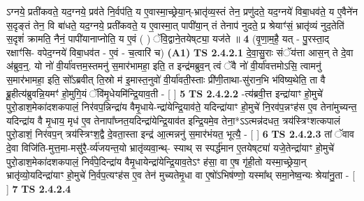 \documentclass[17pt]{extarticle}
\begin{document}
                  ऽग्नये॒ प्रती॑कवते॒ यद॒ग्नये॒ प्रव॑ते नि॒र्वप॑ति॒ य ए॒वास्मा॒च्छ्रेया॒न्-भ्रातृ॑व्य॒स्तं तेन॒ प्रणु॑दते॒ यद॒ग्नये॑ विबा॒धव॑ते॒ य ए॒वैने॑न स॒दृङ्तं तेन॒ वि बा॑धते॒ यद॒ग्नये॒ प्रती॑कवते॒ य ए॒वास्मा॒त् पापी॑या॒न् तं तेनाप॑ नुदते॒ प्र श्रेयाꣳ॑सं॒ भ्रातृ॑व्यं नुद॒तेति॑ स॒दृशं॑ क्रामति॒ नैनं॒ पापी॑यानाप्नोति॒ य ए॒वं ( ) ॅवि॒द्वाने॒तयेष्‌ट्या॒ यज॑ते ॥ \textbf{  4 } \newline
                  \newline
                      (वृ॒णा॒म॒है॒ यत् - पु॒रस्ता॒द् रक्षाꣳ॑सि- वपेद॒ग्नये॑ विबा॒धव॑त - ए॒वं - च॒त्वारि॑ च)  \textbf{(A1)} \newline \newline
                                        \textbf{ TS 2.4.2.1} \newline
                  दे॒वा॒सु॒राः संॅय॑त्ता आस॒न् ते दे॒वा अ॑ब्रुव॒न्॒. यो नो॑ वी॒र्या॑वत्तम॒स्तमनु॑ स॒मार॑भामहा॒ इति॒ त इन्द्र॑मब्रुव॒न् त्वं ॅवै नो॑ वी॒र्या॑वत्तमोऽसि॒ त्वामनु॑ स॒मार॑भामहा॒ इति॒ सो᳚ऽब्रवीत् ति॒स्रो म॑ इ॒मास्त॒नुवो॑ वी॒र्या॑वती॒स्ताः प्री॑णी॒ताथा-सु॑रान॒भि भ॑विष्य॒थेति॒ ता वै ब्रू॒हीत्य॑ब्रुवन्नि॒यमꣳ॑ हो॒मुगि॒यं ॅवि॑मृ॒धेयमि॑न्द्रि॒याव॒ती - [  ] \textbf{  5} \newline
                  \newline
                                \textbf{ TS 2.4.2.2} \newline
                  -त्य॑ब्रवी॒त्त इन्द्रा॑याꣳ हो॒मुचे॑ पुरो॒डाश॒मेका॑दशकपालं॒ निर॑वप॒न्निन्द्रा॑य वैमृ॒धाये-न्द्रा॑येन्द्रि॒याव॑ते॒ यदिन्द्रा॑याꣳ हो॒मुचे॑ नि॒रव॑प॒न्नꣳह॑स ए॒व तेना॑मुच्यन्त॒ यदिन्द्रा॑य वै मृ॒धाय॒ मृध॑ ए॒व तेनापा᳚घ्नत॒यदिन्द्रा॑येन्द्रि॒याव॑त इन्द्रि॒यमे॒व तेना॒*ऽऽत्मन्न॑दधत॒ त्रय॑स्त्रिꣳशत्कपालं पुरो॒डाशं॒ निर॑वप॒न् त्रय॑स्त्रिꣳश॒द्वै दे॒वता॒स्ता इन्द्र॑ आ॒त्मन्ननु॑ स॒मार॑भंयत॒ भूत्यै॒ - [  ] \textbf{  6} \newline
                  \newline
                                \textbf{ TS 2.4.2.3} \newline
                  तां ॅवाव दे॒वा विजि॑ति-मुत्त॒मा-मसु॑रै॒-र्व्य॑जयन्त॒यो भ्रातृ॑व्यवा॒न्थ्- स्याथ् स स्पर्द्ध॑मान ए॒तयेष्‌ट्या॑ यजे॒तेन्द्रा॑याꣳ हो॒मुचे॑ पुरो॒डाश॒मेका॑दशकपालं॒ निर्व॑पे॒दिन्द्रा॑य वैमृ॒धायेन्द्रा॑येन्द्रि॒याव॒तेऽꣳ ह॑सा॒ वा ए॒ष गृ॑ही॒तो यस्मा॒च्छ्रेया॒न् भ्रातृ॑व्यो॒यदिन्द्रा॑याꣳ हो॒मुचे॑ नि॒र्वप॒त्यꣳह॑स ए॒व तेन॑ मुच्यतेमृ॒धा वा ए॒षो॑ऽभिष॑ण्णो॒ यस्मा᳚थ् समा॒नेष्व॒न्यः श्रेया॑नु॒ता - [  ] \textbf{  7} \newline
                  \newline
                                \textbf{ TS 2.4.2.4} \newline
\end{document}
